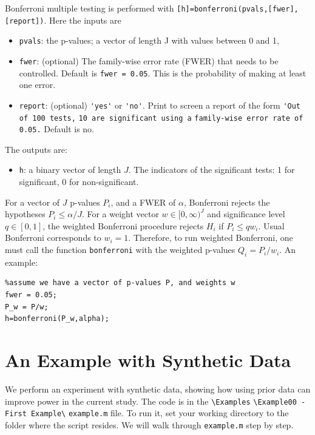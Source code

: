 \documentclass[english,11pt]{article} %
\begin{document}
Bonferroni multiple testing is performed with \verb+[h]=bonferroni(pvals,[fwer],[report])+. Here the inputs are 

\begin{itemize}
\item \verb+pvals+:  the p-values; a vector of length J with values between 0 and 1, 
\item \verb+fwer+: (optional) The family-wise error rate (FWER) that needs to be controlled. Default is \verb+fwer = 0.05+. This is the probability of making at least one error.  
\item \verb+report+: (optional) \verb+'yes'+ or \verb+'no'+. Print to screen a report of the form \verb+'Out of 100 tests,+  \verb+10 are significant using a+  \verb+family-wise error rate of 0.05.+ Default is no.
\end{itemize}

The outputs are: 
\begin{itemize}
\item \verb+h+:  a binary vector of length $J$. The indicators of the significant tests: 1 for significant, 0 for non-significant.
\end{itemize}

For a vector of $J$ p-values $P_i$, and a FWER of $\alpha$, Bonferroni rejects the hypotheses $P_i \le \alpha/J$. For a weight vector $w \in [0,\infty)^{J}$ and significance level $q \in [0,1]$, the weighted Bonferroni procedure rejects $H_{i}$ if $P_i \le q w_i$. Usual Bonferroni corresponds to $w_i=1$. Therefore, to run weighted Bonferroni, one must call the function \verb+bonferroni+ with the weighted p-values $Q_i = P_i/w_i$. An example:

\begin{verbatim}
%assume we have a vector of p-values P, and weights w
fwer = 0.05;
P_w = P/w;
h=bonferroni(P_w,alpha);
\end{verbatim}


\section{An Example with Synthetic Data}
\label{example}

We perform an experiment with synthetic data, showing how using prior data can improve power in the current study. The code is in the \verb+\Examples+ \verb+\Example00 - First Example\+ \verb+example.m+ file. To run it, set your working directory to the folder where the script resides. We will walk through  \verb+example.m+ step by step.
\end{document}
